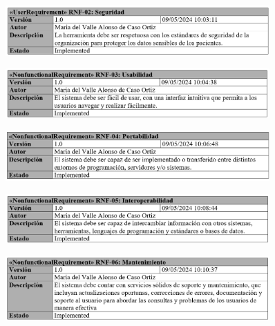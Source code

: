 \begin{figure}[H]
    \centering
    \includegraphics[width=0.90\textwidth]{tables/RNF02.png}
    \label{fig:RNF02}
\end{figure}

\begin{figure}[H]
    \centering
    \includegraphics[width=0.90\textwidth]{tables/RNF03.png}
    \label{fig:RNF03}
\end{figure}

\begin{figure}[H]
    \centering
    \includegraphics[width=0.90\textwidth]{tables/RNF04.png}
    \label{fig:RNF04}
\end{figure}

\begin{figure}[H]
    \centering
    \includegraphics[width=0.90\textwidth]{tables/RNF05.png}
    \label{fig:RNF05}
\end{figure}

\begin{figure}[H]
    \centering
    \includegraphics[width=0.90\textwidth]{tables/RNF06.png}
    \label{fig:RNF06}
\end{figure}

